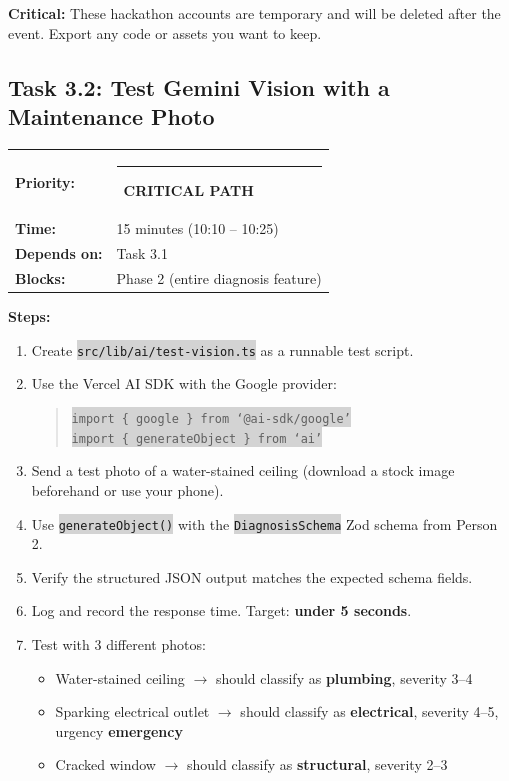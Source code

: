 \documentclass[11pt, a4paper]{article}
\newcommand{\critical}{\textcolor{critred}{\rule{6pt}{6pt}}~\textcolor{critred}{\scriptsize\textbf{CRITICAL PATH}}}
\newcommand{\code}[1]{\texttt{\small\colorbox{lightgray}{#1}}}
\begin{document}
\begin{warningbox}
\textbf{Critical:} These hackathon accounts are temporary and will be deleted after the event. Export any code or assets you want to keep.
\end{warningbox}

\vspace{1em}

\subsection{Task 3.2: Test Gemini Vision with a Maintenance Photo}

\begin{tabularx}{\textwidth}{lX}
\textbf{Priority:} & \critical \\
\textbf{Time:} & 15 minutes (10:10 -- 10:25) \\
\textbf{Depends on:} & Task 3.1 \\
\textbf{Blocks:} & Phase 2 (entire diagnosis feature) \\
\end{tabularx}

\vspace{0.3em}

\textbf{Steps:}
\begin{enumerate}[leftmargin=2em, itemsep=2pt]
  \item Create \code{src/lib/ai/test-vision.ts} as a runnable test script.
  \item Use the Vercel AI SDK with the Google provider:
    \begin{quote}
    \code{import \{ google \} from `@ai-sdk/google'}\\
    \code{import \{ generateObject \} from `ai'}
    \end{quote}
  \item Send a test photo of a water-stained ceiling (download a stock image beforehand or use your phone).
  \item Use \code{generateObject()} with the \code{DiagnosisSchema} Zod schema from Person 2.
  \item Verify the structured JSON output matches the expected schema fields.
  \item Log and record the response time. Target: \textbf{under 5 seconds}.
  \item Test with 3 different photos:
    \begin{itemize}[itemsep=1pt]
      \item Water-stained ceiling $\rightarrow$ should classify as \textbf{plumbing}, severity 3--4
      \item Sparking electrical outlet $\rightarrow$ should classify as \textbf{electrical}, severity 4--5, urgency \textbf{emergency}
      \item Cracked window $\rightarrow$ should classify as \textbf{structural}, severity 2--3
    \end{itemize}
\end{enumerate}
\end{document}
